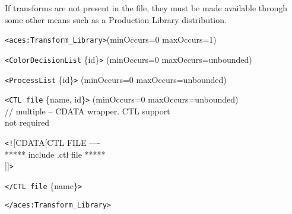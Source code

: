 If transforms are not present in the file, they must be made available through some other means such as a Production Library distribution.

\texttt{<aces:Transform\_Library>}\tabto{2in}(minOccurs=0 maxOccurs=1)

	\tabto{4em}\texttt{<ColorDecisionList} \{id\}\texttt{>} \tabto{3in}(minOccurs=0 maxOccurs=unbounded)\par
	\tabto{4em}\texttt{<ProcessList} \{id\}\texttt{>} \tabto{3in}(minOccurs=0 maxOccurs=unbounded)\par
	\tabto{4em}\texttt{<CTL file} \{name, id\}\texttt{>} \tabto{3in}(minOccurs=0 maxOccurs=unbounded) \\\tabto{3in}// multiple -- CDATA wrapper. CTL support \\\tabto{3.1in}not required\par
    \tabto{6em}\texttt{<!}[CDATA[CTL FILE ----\\
    \tabto{6.1em}***** include .ctl file *****\\
    \tabto{6em}]]\texttt{>}\par
	\tabto{4em}\texttt{</CTL file} \{name\}\texttt{>}
	
\texttt{</aces:Transform\_Library>}